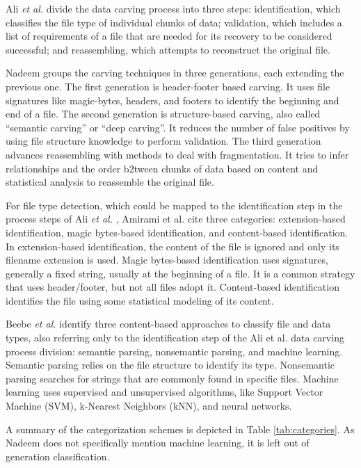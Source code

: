 Ali \textit{et al.} \cite{ali_review_2018} divide the data carving process into three steps:
    identification, which classifies the file type of individual chunks of data; 
    validation, which includes a list of requirements of a file that are needed for its recovery to be considered successful; and
    reassembling, which attempts to reconstruct the original file.
    
Nadeem \cite{nadeem_ashraf_forensic_2013} groups the carving techniques in three generations, each extending the previous one.
The first generation is header-footer based carving. It uses file signatures like magic-bytes, headers, and footers to identify the beginning and end of a file.
The second generation is structure-based carving, also called ``semantic carving'' or ``deep carving''. It reduces the number of false positives by using file structure knowledge to perform validation.
The third generation advances reassembling with methods to deal with fragmentation. It tries to infer relationships and the order b2tween chunks of data based on content and statistical analysis to reassemble the original file.

For file type detection, which could be mapped to the identification step in the  process steps of Ali \textit{et al.} \cite{ali_review_2018}, Amirami et al. \cite{amirani_new_2008} cite three categories: extension-based identification, magic bytes-based identification, and content-based identification.
In extension-based identification, the content of the file is ignored and only its filename extension is used. Magic bytes-based identification uses signatures, generally a fixed string, usually at the beginning of a file. It is a common strategy that uses header/footer, but not all files adopt it. Content-based identification identifies the file using some statistical modeling of its content.

Beebe \textit{et al.} \cite{beebe_sceadan:_2013} identify three content-based approaches to classify file and data types, also referring only to the identification step of the Ali et al. \cite{ali_review_2018} data carving process division: semantic parsing, nonsemantic parsing, and machine learning. Semantic parsing relies on the file structure to identify its type. Nonsemantic parsing searches for strings that are commonly found in specific files. Machine learning uses supervised and unsupervised algorithms, like Support Vector Machine (SVM), k-Nearest Neighbors (kNN), and neural networks.

A summary of the categorization schemes is depicted in Table \ref{tab:categories}. As Nadeem \cite{nadeem_ashraf_forensic_2013} does not specifically mention machine learning, it is left out of generation classification.



